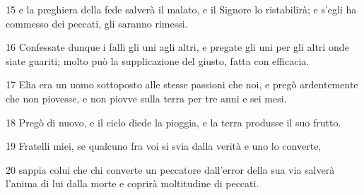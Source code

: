 \par 15 e la preghiera della fede salverà il malato, e il Signore lo ristabilirà; e s'egli ha commesso dei peccati, gli saranno rimessi.
\par 16 Confessate dunque i falli gli uni agli altri, e pregate gli uni per gli altri onde siate guariti; molto può la supplicazione del giusto, fatta con efficacia.
\par 17 Elia era un uomo sottoposto alle stesse passioni che noi, e pregò ardentemente che non piovesse, e non piovve sulla terra per tre anni e sei mesi.
\par 18 Pregò di nuovo, e il cielo diede la pioggia, e la terra produsse il suo frutto.
\par 19 Fratelli miei, se qualcuno fra voi si svia dalla verità e uno lo converte,
\par 20 sappia colui che chi converte un peccatore dall'error della sua via salverà l'anima di lui dalla morte e coprirà moltitudine di peccati.


